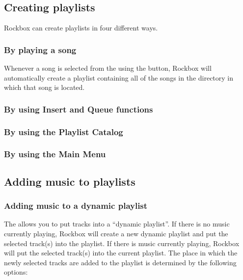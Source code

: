 \subsection{Creating playlists}

Rockbox can create playlists in four different ways.

\subsubsection{By playing a song}
Whenever a song is selected from the  using the
 button, Rockbox will
automatically create a playlist containing all of the songs in the directory
in which that song is located.


\subsubsection{By using Insert and Queue functions}

\subsubsection{By using the Playlist Catalog}

\subsubsection{By using the Main Menu}

\subsection{Adding music to playlists}
  
\subsubsection{\label{ref:playlist_submenu}Adding music to a dynamic playlist}
The  allows you to put tracks into a
``dynamic playlist''. If there is no music currently playing, Rockbox will
create a new dynamic playlist and put the selected track(s) into the
playlist. If there is music currently playing, Rockbox will put the
selected track(s) into the current playlist. The place in which the newly
selected tracks are added to the playlist is determined by the following
options:

